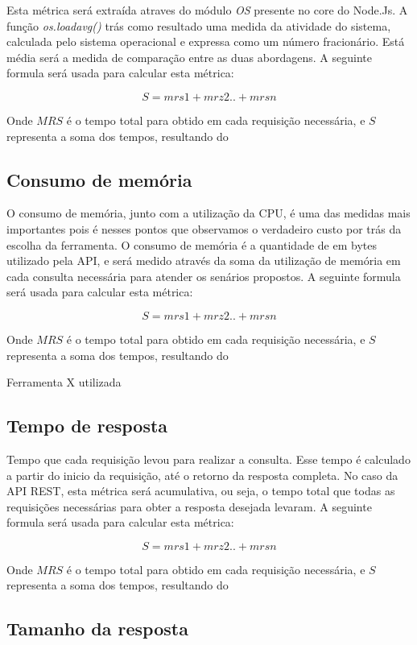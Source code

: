 Esta métrica será extraída atraves do módulo \textit{OS} presente no \textrm{core} do Node.Js. A função \textit{os.loadavg()} trás como resultado uma medida da atividade do sistema, calculada pelo sistema operacional e expressa como um número fracionário. Está média será a medida de comparação entre as duas abordagens. A seguinte formula será usada para calcular esta métrica: 

$$S=mrs1+mrz2..+mrsn$$

Onde $MRS$ é o tempo total para obtido em cada requisição necessária, e $S$ representa a soma dos tempos, resultando do 

\subsection*{Consumo de memória}

O consumo de memória, junto com a utilização da CPU, é uma das medidas mais importantes pois é nesses pontos que observamos o verdadeiro custo por trás da escolha da ferramenta. O consumo de memória é a quantidade de em bytes utilizado pela API, e será medido através da soma da utilização de memória em cada consulta necessária para atender os senários propostos. A seguinte formula será usada para calcular esta métrica: 

$$S=mrs1+mrz2..+mrsn$$

Onde $MRS$ é o tempo total para obtido em cada requisição necessária, e $S$ representa a soma dos tempos, resultando do 

Ferramenta X utilizada

\subsection*{Tempo de resposta}

Tempo que cada requisição levou para realizar a consulta. Esse tempo é calculado a partir do inicio da requisição, até o retorno da resposta completa. No caso da API REST, esta métrica será acumulativa, ou seja, o tempo total que todas as requisições necessárias para obter a resposta desejada levaram. A seguinte formula será usada para calcular esta métrica: 

$$S=mrs1+mrz2..+mrsn$$

Onde $MRS$ é o tempo total para obtido em cada requisição necessária, e $S$ representa a soma dos tempos, resultando do 

\subsection*{Tamanho da resposta}

